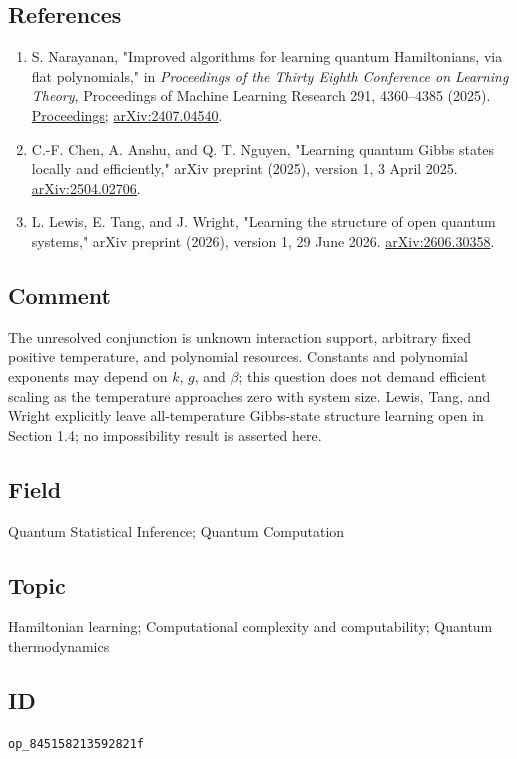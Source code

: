 \subsection*{References}

\begin{enumerate}[label={},leftmargin=4.8em,labelsep=0.5em]
  \footnotesize
  \item[\textup{[Narayanan25]}]\label{ref:8451-narayanan25}
  S. Narayanan, "Improved algorithms for learning quantum Hamiltonians, via flat polynomials," in \emph{Proceedings of the Thirty Eighth Conference on Learning Theory}, Proceedings of Machine Learning Research 291, 4360–4385 (2025). \href{https://proceedings.mlr.press/v291/narayanan25a.html}{Proceedings}; \href{https://arxiv.org/abs/2407.04540}{arXiv:2407.04540}.

  \item[\textup{[Chen25]}]\label{ref:8451-chen25}
  C.-F. Chen, A. Anshu, and Q. T. Nguyen, "Learning quantum Gibbs states locally and efficiently," arXiv preprint (2025), version 1, 3 April 2025. \href{https://arxiv.org/abs/2504.02706}{arXiv:2504.02706}.

  \item[\textup{[Lewis26]}]\label{ref:8451-lewis26}
  L. Lewis, E. Tang, and J. Wright, "Learning the structure of open quantum systems," arXiv preprint (2026), version 1, 29 June 2026. \href{https://arxiv.org/abs/2606.30358}{arXiv:2606.30358}.
\end{enumerate}

\subsection*{Comment}

The unresolved conjunction is unknown interaction support, arbitrary fixed positive temperature, and polynomial resources. Constants and polynomial exponents may depend on $k$, $g$, and $\beta$; this question does not demand efficient scaling as the temperature approaches zero with system size. Lewis, Tang, and Wright explicitly leave all-temperature Gibbs-state structure learning open in Section 1.4; no impossibility result is asserted here.

\subsection*{Field}

Quantum Statistical Inference; Quantum Computation

\subsection*{Topic}

Hamiltonian learning; Computational complexity and computability; Quantum thermodynamics

\subsection*{ID}

\texttt{op\_845158213592821f}
